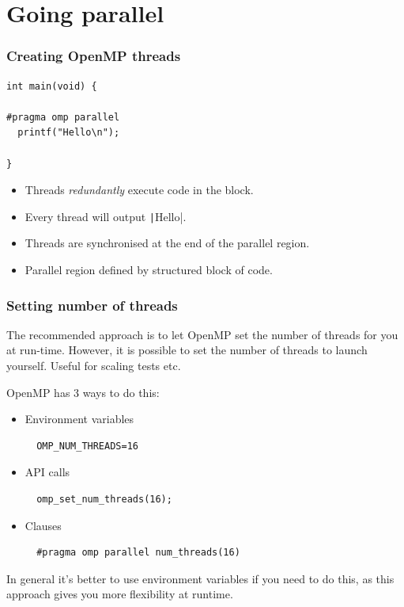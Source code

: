 \documentclass[aspectratio=169]{beamer}
\begin{document}
\section{Going parallel}
\begin{frame}[fragile]
\frametitle{Creating OpenMP threads}
\begin{verbatim}
int main(void) {

#pragma omp parallel
  printf("Hello\n");

}
\end{verbatim}

\begin{itemize}
  \item Threads \emph{redundantly} execute code in the block.
  \item Every thread will output \texttt|Hello|.
  \item Threads are synchronised at the end of the parallel region.
  \item Parallel region defined by structured block of code.
\end{itemize}

\end{frame}


\begin{frame}[fragile]
\frametitle{Setting number of threads}
The recommended approach is to let OpenMP set the number of threads for you at run-time. However, it is possible to set the number of threads to launch yourself. Useful for scaling tests etc.

OpenMP has 3 ways to do this:
\begin{itemize}
  \item Environment variables
  \begin{verbatim}
  OMP_NUM_THREADS=16
  \end{verbatim}

  \item API calls
  \begin{verbatim}
  omp_set_num_threads(16);
  \end{verbatim}

  \item Clauses
  \begin{verbatim}
  #pragma omp parallel num_threads(16)
  \end{verbatim}
\end{itemize}

In general it's better to use environment variables if you need to do this, as this approach gives you more flexibility at runtime.
\end{frame}
\end{document}
